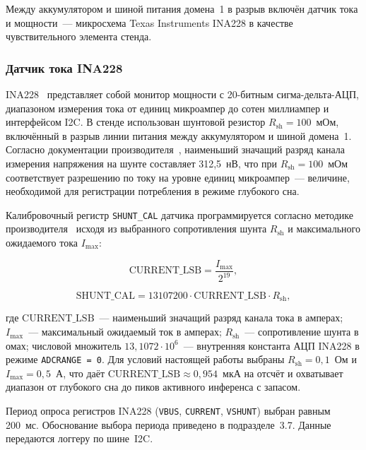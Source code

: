 Между аккумулятором и шиной питания домена~1 в разрыв включён
датчик тока и мощности~--- микросхема Texas Instruments INA228
в качестве чувствительного элемента стенда.

\subsubsection{Датчик тока INA228}

INA228~\cite{src:16} представляет собой монитор мощности с
20-битным сигма-дельта-АЦП, диапазоном измерения тока от единиц
микроампер до сотен миллиампер и интерфейсом I2C. В стенде
использован шунтовой резистор $R_{\mathrm{sh}} = 100$~мОм,
включённый в разрыв линии питания между аккумулятором и шиной
домена~1. Согласно документации производителя~\cite{src:16},
наименьший значащий разряд канала измерения напряжения на
шунте составляет 312,5~нВ, что при $R_{\mathrm{sh}} = 100$~мОм
соответствует разрешению по току на уровне единиц
микроампер~--- величине, необходимой для регистрации
потребления в режиме глубокого сна.

Калибровочный регистр \texttt{SHUNT\_CAL} датчика
программируется согласно методике
производителя~\cite{src:16} исходя из выбранного сопротивления
шунта $R_{\mathrm{sh}}$ и максимального ожидаемого тока
$I_{\max}$:

\begin{equation}
	\mathrm{CURRENT\_LSB} = \frac{I_{\max}}{2^{19}},
	\label{eq:current_lsb}
\end{equation}

\begin{equation}
	\mathrm{SHUNT\_CAL} = 13107200 \cdot \mathrm{CURRENT\_LSB} \cdot R_{\mathrm{sh}},
	\label{eq:shunt_cal}
\end{equation}

где $\mathrm{CURRENT\_LSB}$~--- наименьший значащий разряд
канала тока в амперах; $I_{\max}$~--- максимальный ожидаемый
ток в амперах; $R_{\mathrm{sh}}$~--- сопротивление шунта в
омах; числовой множитель $13{,}1072 \cdot 10^{6}$~---
внутренняя константа АЦП INA228 в режиме
\texttt{ADCRANGE = 0}. Для условий настоящей работы выбраны
$R_{\mathrm{sh}} = 0{,}1$~Ом и $I_{\max} = 0{,}5$~А, что даёт
$\mathrm{CURRENT\_LSB} \approx 0{,}954$~мкА на отсчёт и
охватывает диапазон от глубокого сна до пиков активного
инференса с запасом.

Период опроса регистров INA228 (\texttt{VBUS},
\texttt{CURRENT}, \texttt{VSHUNT}) выбран равным 200~мс.
Обоснование выбора периода приведено в подразделе~3.7. Данные
передаются логгеру по шине~I2C.


